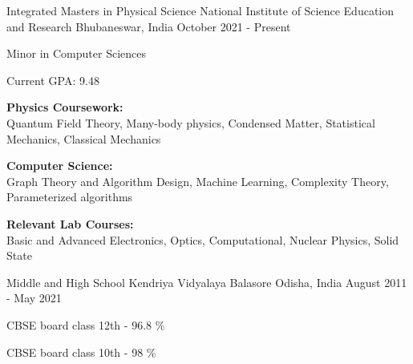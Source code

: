 

\begin{cventries}

  \cventry
    {Integrated Masters in Physical Science} %
    {National Institute of Science Education and Research} %
    {Bhubaneswar, India} %
    {October 2021 - Present} %
    {
      \begin{cvitems} %
        \item {Minor in Computer Sciences}
        \item {Current GPA: 9.48}
        \item{\textbf{Physics Coursework:} \\Quantum Field Theory, Many-body physics, Condensed Matter, Statistical Mechanics, Classical Mechanics} 
        \item{\textbf{Computer Science:} \\Graph Theory and Algorithm Design, Machine Learning, Complexity Theory, Parameterized algorithms}
        \item{\textbf{Relevant Lab Courses:} \\Basic and Advanced Electronics, Optics, Computational, Nuclear Physics, Solid State}\\
      \end{cvitems}
    }
        
    
  \cventry
    {Middle and High School} %
    {Kendriya Vidyalaya Balasore} %
    {Odisha, India} %
    {August 2011 - May 2021} %
    {
      \begin{cvitems} %
        \item CBSE board class 12th - 96.8 \%
        \item CBSE board class 10th - 98 \%
      \end{cvitems}
    }
\end{cventries}

